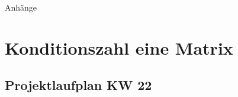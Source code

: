 %
%
%
%

\begin{appendix}

\newpage

\begin{center}
	\huge{Anhänge}
\end{center}

\normalsize

\section{Konditionszahl eine Matrix}
\label{seq:ConditionNumber}


\newpage




\newpage
\begin{landscape}
	\section{Projektlaufplan KW 22}
	\label{sec:projectplan}
	\scalebox{.75}{
		
		}
\end{landscape}


\end{appendix}
